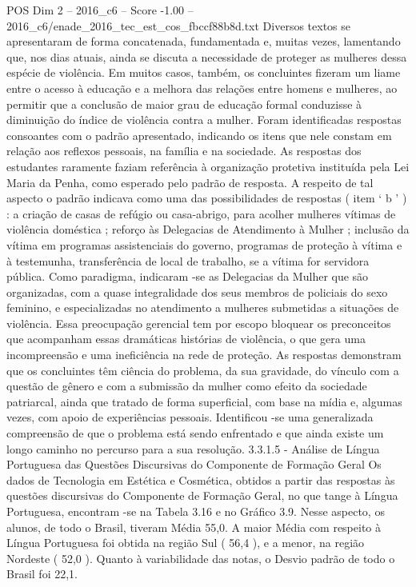 \begin{textsample}{POS Dim 2 – 2016\_c6 – Score -1.00 – 2016\_c6/enade\_2016\_tec\_est\_cos\_fbccf88b8d.txt}
Diversos textos se apresentaram de forma concatenada, fundamentada e, muitas vezes, lamentando que, nos dias atuais, ainda se discuta a necessidade de proteger as mulheres dessa espécie de violência.
Em muitos casos, também, os concluintes fizeram um liame entre o acesso à educação e a melhora das relações entre homens e mulheres, ao permitir que a conclusão de maior grau de educação formal conduzisse à diminuição do índice de violência contra a mulher.
Foram identificadas respostas consoantes com o padrão apresentado, indicando os itens que nele constam em relação aos reflexos pessoais, na família e na sociedade.
As respostas dos estudantes raramente faziam referência à organização protetiva instituída pela Lei Maria da Penha, como esperado pelo padrão de resposta.
A respeito de tal aspecto o padrão indicava como uma das possibilidades de respostas ( item ‘ b ’ ) : a criação de casas de refúgio ou casa-abrigo, para acolher mulheres vítimas de violência doméstica ; reforço às Delegacias de Atendimento à Mulher ; inclusão da vítima em programas assistenciais do governo, programas de proteção à vítima e à testemunha, transferência de local de trabalho, se a vítima for servidora pública.
Como paradigma, indicaram -se as Delegacias da Mulher que são organizadas, com a quase integralidade dos seus membros de policiais do sexo feminino, e especializadas no atendimento a mulheres submetidas a situações de violência.
Essa preocupação gerencial tem por escopo bloquear os preconceitos que acompanham essas dramáticas histórias de violência, o que gera uma incompreensão e uma ineficiência na rede de proteção.
As respostas demonstram que os concluintes têm ciência do problema, da sua gravidade, do vínculo com a questão de gênero e com a submissão da mulher como efeito da sociedade patriarcal, ainda que tratado de forma superficial, com base na mídia e, algumas vezes, com apoio de experiências pessoais.
Identificou -se uma generalizada compreensão de que o problema está sendo enfrentado e que ainda existe um longo caminho no percurso para a sua resolução. 3.3.1.5 - Análise de Língua Portuguesa das Questões Discursivas do Componente de Formação Geral Os dados de Tecnologia em Estética e Cosmética, obtidos a partir das respostas às questões discursivas do Componente de Formação Geral, no que tange à Língua Portuguesa, encontram -se na Tabela 3.16 e no Gráfico 3.9.
Nesse aspecto, os alunos, de todo o Brasil, tiveram Média 55,0.
A maior Média com respeito à Língua Portuguesa foi obtida na região Sul ( 56,4 ), e a menor, na região Nordeste ( 52,0 ).
Quanto à variabilidade das notas, o Desvio padrão de todo o Brasil foi 22,1.

\end{textsample}
